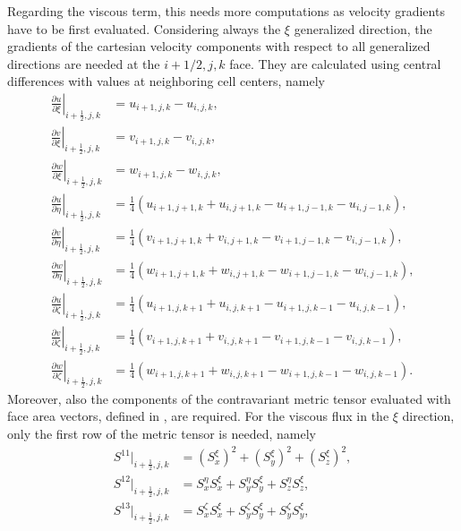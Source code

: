 Regarding the viscous term, this needs more computations as velocity gradients have to be first evaluated. Considering always the $\xi$ generalized direction, the gradients of the cartesian velocity components with respect to all generalized directions are needed at the $i+1/2,j,k$ face. They are calculated using central differences with values at neighboring cell centers, namely
\begin{align}
	\left.\frac{\partial u}{\partial \xi}\right|_{i+\frac{1}{2}, j, k} & =u_{i+1, j, k}-u_{i, j, k}, \nonumber \\
	\left.\frac{\partial v}{\partial \xi}\right|_{i+\frac{1}{2}, j, k} & =v_{i+1, j, k}-v_{i, j, k}, \nonumber \\
	\left.\frac{\partial w}{\partial \xi}\right|_{i+\frac{1}{2}, j, k} & =w_{i+1, j, k}-w_{i, j, k}, \nonumber \\
	\left.\frac{\partial u}{\partial \eta}\right|_{i+\frac{1}{2}, j, k} & =\frac{1}{4}\left(u_{i+1, j+1, k}+u_{i, j+1, k}-u_{i+1, j-1, k}-u_{i, j-1, k}\right), \nonumber \\
	\left.\frac{\partial v}{\partial \eta}\right|_{i+\frac{1}{2}, j, k} & =\frac{1}{4}\left(v_{i+1, j+1, k}+v_{i, j+1, k}-v_{i+1, j-1, k}-v_{i, j-1, k}\right), \nonumber \\
	\left.\frac{\partial w}{\partial \eta}\right|_{i+\frac{1}{2}, j, k} & =\frac{1}{4}\left(w_{i+1, j+1, k}+w_{i, j+1, k}-w_{i+1, j-1, k}-w_{i, j-1, k}\right), \nonumber \\
	\left.\frac{\partial u}{\partial \zeta}\right|_{i+\frac{1}{2}, j, k} & =\frac{1}{4}\left(u_{i+1, j, k+1}+u_{i, j, k+1}-u_{i+1, j, k-1}-u_{i, j, k-1}\right), \nonumber \\
	\left.\frac{\partial v}{\partial \zeta}\right|_{i+\frac{1}{2}, j, k} & =\frac{1}{4}\left(v_{i+1, j, k+1}+v_{i, j, k+1}-v_{i+1, j, k-1}-v_{i, j, k-1}\right), \nonumber \\
	\left.\frac{\partial w}{\partial \zeta}\right|_{i+\frac{1}{2}, j, k} & =\frac{1}{4}\left(w_{i+1, j, k+1}+w_{i, j, k+1}-w_{i+1, j, k-1}-w_{i, j, k-1}\right). \nonumber 
\end{align}
Moreover, also the components of the contravariant metric tensor evaluated with face area vectors, defined in , are required. For the viscous flux in the $\xi$ direction, only the first row of the metric tensor is needed, namely
\begin{align}
	S^{11}\bigg|_{i+\frac{1}{2},j,k} &= \left(S_x^\xi\right)^2 + \left(S_y^\xi\right)^2 + \left(S_z^\xi\right)^2, \nonumber \\
	S^{12}\bigg|_{i+\frac{1}{2},j,k} &= S_x^\eta S_x^\xi + S_y^\eta S_y^\xi + S_z^\eta S_z^\xi, \nonumber \\
	S^{13}\bigg|_{i+\frac{1}{2},j,k} &= S_x^\zeta S_x^\xi + S_y^\zeta S_y^\xi + S_y^\zeta S_y^\xi, \label{eq:metricTensorViscousCsi}
\end{align}
